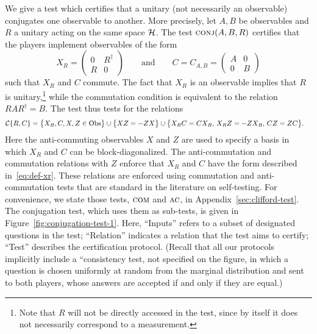 We give a test which certifies that a unitary (not necessarily an observable) conjugates one observable to another. More precisely, let $A,B$ be observables and $R$ a unitary acting on the same space $\mathcal{H}$. The test $\textsc{conj}(A,B,R)$ certifies that the players implement observables of the form
\begin{equation}\label{eq:def-xr}
X_R = \begin{pmatrix} 0 & R^\dagger\\ R & 0 \end{pmatrix}\qquad \text{and}\qquad C = C_{A,B} = \begin{pmatrix} A & 0\\ 0 & B \end{pmatrix}
\end{equation}
such that $X_R$ and $C$ commute. The fact that $X_R$ is an observable implies that $R$ is unitary,\footnote{Note that $R$ will not be directly accessed in the test, since by itself it does not necessarily correspond to a measurement.} while the commutation condition is equivalent to the relation $RAR^\dagger = B$. The test thus tests for the relations
\begin{align*}
 \mathcal{C}\{R,C\} &= \big\{ X_R,C,X,Z\in \mathrm{Obs}\big\} \cup \big\{XZ=-ZX\big\}
\cup \big\{ X_R C = C X_R,\, X_RZ=-Z X_R,\, C Z=ZC\big\}.
\end{align*}
Here the anti-commuting observables $X$ and $Z$ are used to specify a basis in which $X_R$ and $C$ can be block-diagonalized. The anti-commutation and commutation relations with $Z$ enforce that $X_R$ and $C$ have the form described in~\eqref{eq:def-xr}.
These relations are enforced using commutation and anti-commutation tests that are standard in the literature on self-testing. For convenience, we state those tests, $\textsc{com}$ and $\textsc{ac}$, in Appendix~\ref{sec:clifford-test}. The conjugation test, which uses them as sub-tests, is given in Figure~\ref{fig:conjugation-test-1}. Here, ``Inputs'' refers to a subset of designated questions in the test; ``Relation'' indicates a relation that the test aims to certify; ``Test'' describes the certification protocol. (Recall that all our protocols implicitly include a ``consistency test, not specified on the figure, in which a question is chosen uniformly at random from the marginal distribution and sent to both players, whose answers are accepted if and only if they are equal.)

